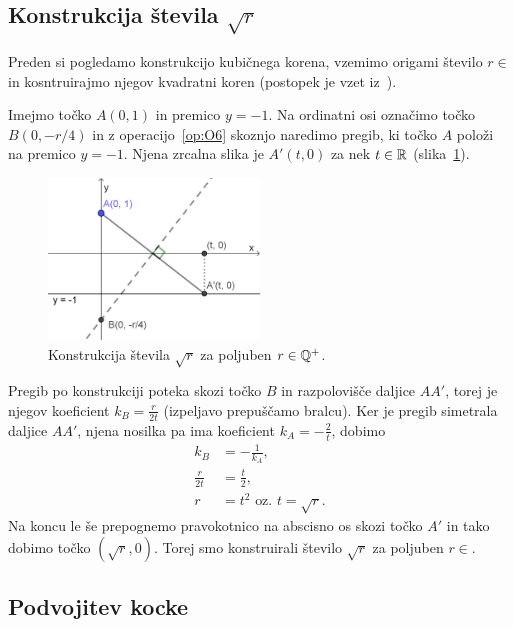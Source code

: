 \subsection*{Konstrukcija števila $\sqrt{r}$}

Preden si pogledamo konstrukcijo kubičnega korena, vzemimo origami število $r \in $ in kosntruirajmo njegov kvadratni koren (postopek je vzet iz~\cite[str.\ 58]{hull2013}).

Imejmo točko $A (0, 1) $ in premico $y = -1$. Na ordinatni osi označimo točko $B (0, -r/4)$ in z operacijo~\ref{op:O6} skoznjo naredimo pregib, ki točko $A$ položi na premico $y = -1$. Njena zrcalna slika je $A' (t, 0) $ za nek $t \in \mathbb R$ (slika~\ref{fig:konstrukcija_korena}).

\begin{figure}[h]
    \centering
    \includegraphics[width=0.5\textwidth]{images/kvadratni_koren.png}
    \caption[Konstrukcija korena]{Konstrukcija števila $\sqrt{r}$ za poljuben $r \in \mathbb Q^{+}$.}
    \label{fig:konstrukcija_korena}
\end{figure}

Pregib po konstrukciji poteka skozi točko $B$ in razpolovišče daljice $AA'$, torej je njegov koeficient $k_B = \frac{r}{2t}$ (izpeljavo prepuščamo bralcu). Ker je pregib simetrala daljice $AA'$, njena nosilka pa ima koeficient $k_A = - \frac{2}{t}$, dobimo
\begin{align*}
    k_B &= - \frac{1}{k_A},\\
    \frac{r}{2t} &= \frac{t}{2},\\
    r &= t^2 \text{ oz. } t = \sqrt{r}.
\end{align*}
Na koncu le še prepognemo pravokotnico na abscisno os skozi točko $A'$ in tako dobimo točko $(\sqrt{r}, 0)$. Torej smo konstruirali število $\sqrt{r}$ za poljuben $r \in $.

\subsection{Podvojitev kocke}
\label{podpogl:podvojitev_kocke}

